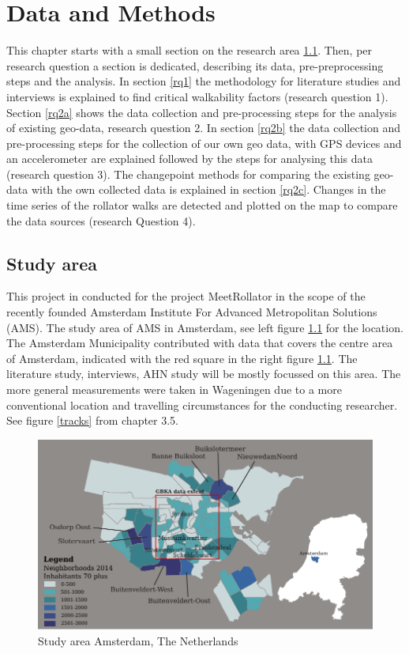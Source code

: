 \chapter[Data and Methods]{Data and Methods}

This chapter starts with a small section on the research area \ref{area}.
Then, per research question a section is dedicated, describing its data, pre-preprocessing steps and the analysis. In section \ref{rq1} the methodology for literature studies and interviews is explained to find critical walkability factors (research question 1). Section \ref{rq2a} shows the data collection and pre-processing steps for the analysis of existing geo-data, research question 2. 
In section \ref{rq2b} the data collection and pre-processing steps for the collection of our own geo data, with GPS devices and an accelerometer are explained followed by the steps for analysing this data (research question 3). The changepoint methods for comparing the existing geo-data with the own collected data is explained in section \ref{rq2c}. Changes in the time series of the rollator walks are detected and plotted on the map to compare the data sources (research Question 4).

\clearpage
\section{Study area}\label{area}
This project in conducted for the project MeetRollator in the scope of the recently founded Amsterdam Institute For Advanced Metropolitan Solutions (AMS). The study area of AMS in Amsterdam, see left figure \ref{kaart} for the location. The Amsterdam Municipality contributed with data that covers the centre area of Amsterdam, indicated with the red square in the right figure \ref{kaart}. 
The literature study, interviews, AHN study will be mostly focussed on this area. The more general measurements were taken in Wageningen due to a more conventional location and travelling circumstances for the conducting researcher. See figure \ref{tracks} from chapter 3.5. 

\begin{figure}[h]
\includegraphics[width=\textwidth]{img/M1_StudyArea.pdf}
\centering
\caption{Study area Amsterdam, The Netherlands\label{kaart}}
\end{figure}

